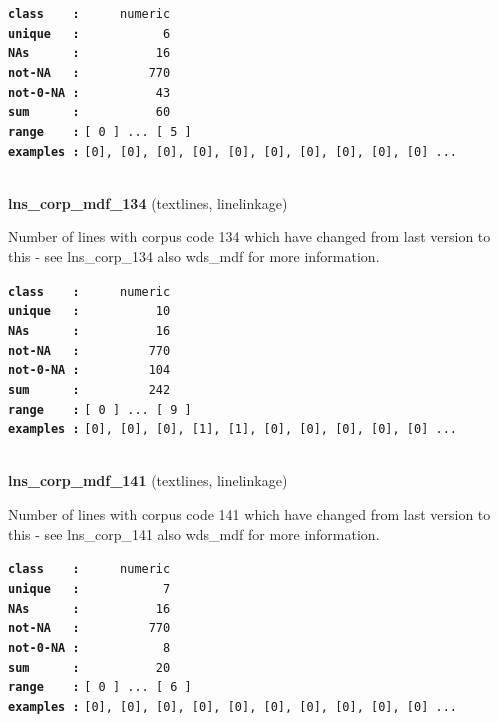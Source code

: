 \documentclass[]{article}
\begin{document}
\textbf{\texttt{class\ \ \ \ :}} \texttt{~~~~~numeric}\\
\textbf{\texttt{unique\ \ \ :}} \texttt{~~~~~~~~~~~6}\\
\textbf{\texttt{NAs\ \ \ \ \ \ :}} \texttt{~~~~~~~~~~16}\\
\textbf{\texttt{not-NA\ \ \ :}} \texttt{~~~~~~~~~770}\\
\textbf{\texttt{not-0-NA\ :}} \texttt{~~~~~~~~~~43}\\
\textbf{\texttt{sum\ \ \ \ \ \ :}} \texttt{~~~~~~~~~~60}\\
\textbf{\texttt{range\ \ \ \ :}}
\texttt{{[}\ 0\ {]}\ ...\ {[}\ 5\ {]}}\\
\textbf{\texttt{examples\ :}}
\texttt{{[}0{]},\ {[}0{]},\ {[}0{]},\ {[}0{]},\ {[}0{]},\ {[}0{]},\ {[}0{]},\ {[}0{]},\ {[}0{]},\ {[}0{]}\ ...}\\

~

\textbf{lns\_corp\_mdf\_134} (textlines, linelinkage)

Number of lines with corpus code 134 which have changed from last
version to this - see lns\_corp\_134 also wds\_mdf for more information.

\textbf{\texttt{class\ \ \ \ :}} \texttt{~~~~~numeric}\\
\textbf{\texttt{unique\ \ \ :}} \texttt{~~~~~~~~~~10}\\
\textbf{\texttt{NAs\ \ \ \ \ \ :}} \texttt{~~~~~~~~~~16}\\
\textbf{\texttt{not-NA\ \ \ :}} \texttt{~~~~~~~~~770}\\
\textbf{\texttt{not-0-NA\ :}} \texttt{~~~~~~~~~104}\\
\textbf{\texttt{sum\ \ \ \ \ \ :}} \texttt{~~~~~~~~~242}\\
\textbf{\texttt{range\ \ \ \ :}}
\texttt{{[}\ 0\ {]}\ ...\ {[}\ 9\ {]}}\\
\textbf{\texttt{examples\ :}}
\texttt{{[}0{]},\ {[}0{]},\ {[}0{]},\ {[}1{]},\ {[}1{]},\ {[}0{]},\ {[}0{]},\ {[}0{]},\ {[}0{]},\ {[}0{]}\ ...}\\

~

\textbf{lns\_corp\_mdf\_141} (textlines, linelinkage)

Number of lines with corpus code 141 which have changed from last
version to this - see lns\_corp\_141 also wds\_mdf for more information.

\textbf{\texttt{class\ \ \ \ :}} \texttt{~~~~~numeric}\\
\textbf{\texttt{unique\ \ \ :}} \texttt{~~~~~~~~~~~7}\\
\textbf{\texttt{NAs\ \ \ \ \ \ :}} \texttt{~~~~~~~~~~16}\\
\textbf{\texttt{not-NA\ \ \ :}} \texttt{~~~~~~~~~770}\\
\textbf{\texttt{not-0-NA\ :}} \texttt{~~~~~~~~~~~8}\\
\textbf{\texttt{sum\ \ \ \ \ \ :}} \texttt{~~~~~~~~~~20}\\
\textbf{\texttt{range\ \ \ \ :}}
\texttt{{[}\ 0\ {]}\ ...\ {[}\ 6\ {]}}\\
\textbf{\texttt{examples\ :}}
\texttt{{[}0{]},\ {[}0{]},\ {[}0{]},\ {[}0{]},\ {[}0{]},\ {[}0{]},\ {[}0{]},\ {[}0{]},\ {[}0{]},\ {[}0{]}\ ...}\\
\end{document}
